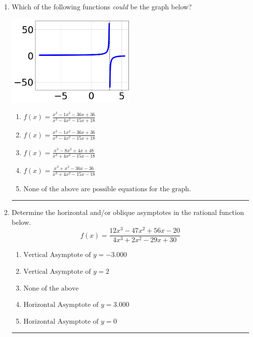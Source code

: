 \documentclass[14pt]{extbook}
\newcommand{\litem}[1]{\item#1\hspace*{-1cm}\rule{\textwidth}{0.4pt}}
\begin{document}
\begin{enumerate}
{\begin{enumerate}[label=\Alph*.]
\end{enumerate} }
\litem{
Which of the following functions \textit{could} be the graph below?
\begin{center}
    \includegraphics[width=0.5\textwidth]{../Figures/identifyGraphOfRationalFunctionA.png}
\end{center}
\begin{enumerate}[label=\Alph*.]
\item \( f(x)=\frac{x^{3} -1 x^{2} -36 x + 36}{x^{3} -4 x^{2} -15 x + 18} \)
\item \( f(x)=\frac{x^{3} -1 x^{2} -36 x + 36}{x^{3} -4 x^{2} -15 x + 18} \)
\item \( f(x)=\frac{x^{3} -8 x^{2} +4 x + 48}{x^{3} +4 x^{2} -15 x -18} \)
\item \( f(x)=\frac{x^{3} + x^{2} -36 x -36}{x^{3} +4 x^{2} -15 x -18} \)
\item \( \text{None of the above are possible equations for the graph.} \)

\end{enumerate} }
\litem{
Determine the horizontal and/or oblique asymptotes in the rational function below.\[ f(x) = \frac{12x^{3} -47 x^{2} +56 x -20}{4x^{3} +2 x^{2} -29 x + 30} \]\begin{enumerate}[label=\Alph*.]
\item \( \text{Vertical Asymptote of } y = -3.000  \)
\item \( \text{Vertical Asymptote of } y = 2  \)
\item \( \text{None of the above} \)
\item \( \text{Horizontal Asymptote of } y = 3.000  \)
\item \( \text{Horizontal Asymptote of } y = 0  \)

\end{enumerate} }
\end{enumerate}
\end{document}
